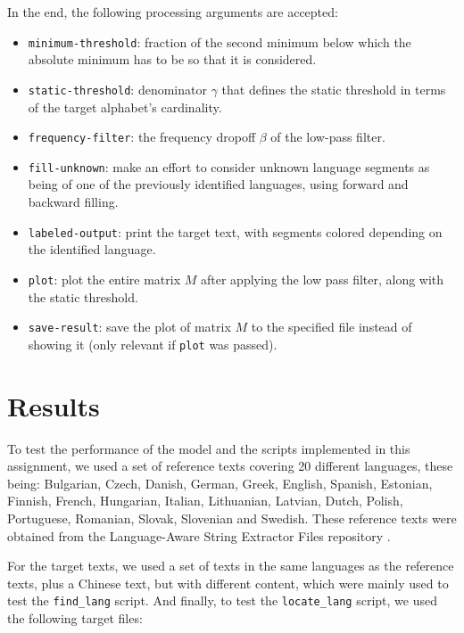 \documentclass{article}
\begin{document}
In the end, the following processing arguments are accepted:
\begin{itemize}
    \item \texttt{minimum-threshold}: fraction of the second minimum below which the absolute minimum has to be so that it is considered.
    \item \texttt{static-threshold}: denominator $\gamma$ that defines the static threshold in terms of the target alphabet's cardinality.
    \item \texttt{frequency-filter}: the frequency dropoff $\beta$ of the low-pass filter.
    \item \texttt{fill-unknown}: make an effort to consider unknown language segments as being of one of the previously identified languages, using forward and backward filling.
    \item \texttt{labeled-output}: print the target text, with segments colored depending on the identified language.
    \item \texttt{plot}: plot the entire matrix $M$ after applying the low pass filter, along with the static threshold.
    \item \texttt{save-result}: save the plot of matrix $M$ to the specified file instead of showing it (only relevant if \texttt{plot} was passed).
\end{itemize}

\section{Results}
\label{sec:results}

To test the performance of the model and the scripts implemented in this assignment, we used a set of reference texts covering 20 different languages,
these being: Bulgarian, Czech, Danish, German, Greek, English, Spanish, Estonian, Finnish, French, Hungarian, Italian, Lithuanian, Latvian, Dutch, Polish, Portuguese, Romanian, Slovak, Slovenian and Swedish.
These reference texts were obtained from the Language-Aware String Extractor Files repository \cite{references:source}.

For the target texts, we used a set of texts in the same languages as the reference texts, plus a Chinese text, but with different content, which were mainly used to test the \texttt{find\_lang} script.
And finally, to test the \texttt{locate\_lang} script, we used the following target files:
\end{document}

